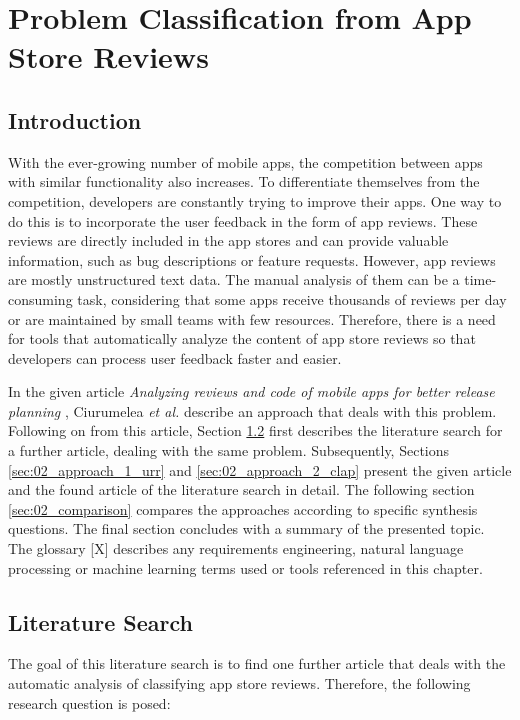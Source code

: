 \chapter{Problem Classification from App Store Reviews}

\section{Introduction}\label{sec:02_introduction}

With the ever-growing number of mobile apps, the competition between apps with similar functionality also increases. To differentiate themselves from the competition, developers are constantly trying to improve their apps. One way to do this is to incorporate the user feedback in the form of app reviews. These reviews are directly included in the app stores and can provide valuable information, such as bug descriptions or feature requests. However, app reviews are mostly unstructured text data. The manual analysis of them can be a time-consuming task, considering that some apps receive thousands of reviews per day or are maintained by small teams with few resources. Therefore, there is a need for tools that automatically analyze the content of app store reviews so that developers can process user feedback faster and easier. 

In the given article \textit{Analyzing reviews and code of mobile apps for better release planning} \cite{Ciurumelea.2017}, Ciurumelea \textit{et al.} describe an approach that deals with this problem. Following on from this article, Section \ref{sec:02_literature_search} first describes the literature search for a further article, dealing with the same problem. Subsequently, Sections \ref{sec:02_approach_1_urr} and \ref{sec:02_approach_2_clap} present the given article and the found article of the literature search in detail. The following section \ref{sec:02_comparison} compares the approaches according to specific synthesis questions. The final section concludes with a summary of the presented topic. The glossary [X] describes any requirements engineering, natural language processing or machine learning terms used or tools referenced in this chapter. 

\section{Literature Search}\label{sec:02_literature_search}

The goal of this literature search is to find one further article that deals with the automatic analysis of classifying app store reviews. Therefore, the following research question is posed:

